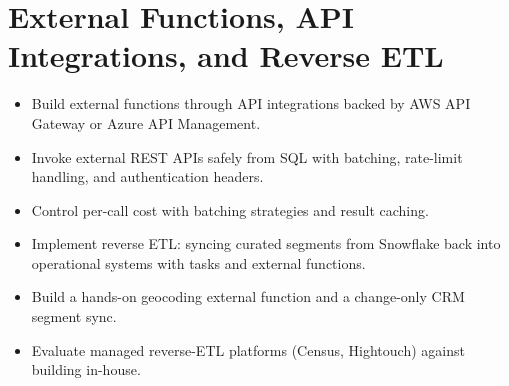 \chapter{External Functions, API Integrations, and Reverse ETL}
%
\begin{objectives}
\begin{itemize}
    \item Build external functions through API integrations backed by AWS API Gateway or Azure API Management.
    \item Invoke external REST APIs safely from SQL with batching, rate-limit handling, and authentication headers.
    \item Control per-call cost with batching strategies and result caching.
    \item Implement reverse ETL: syncing curated segments from Snowflake back into operational systems with tasks and external functions.
    \item Build a hands-on geocoding external function and a change-only CRM segment sync.
    \item Evaluate managed reverse-ETL platforms (Census, Hightouch) against building in-house.
\end{itemize}
\end{objectives}

